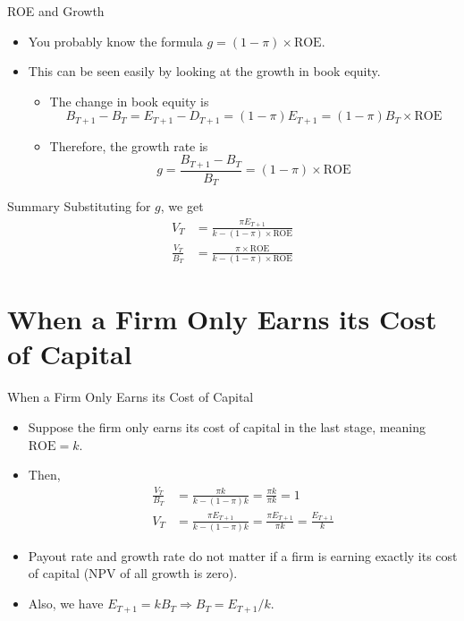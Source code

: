 \documentclass[10pt]{beamer}
\begin{document}
    \begin{frame}{ROE and Growth}
      \begin{itemize}
    \item You probably know the formula $g = (1-\pi) \times \text{ROE}$.
    \item This can be seen easily by looking at the growth in book equity.
      \begin{itemize}
    \item The change in book equity is 
    $$B_{T+1} - B_T = E_{T+1} - D_{T+1} = (1-\pi)E_{T+1} = (1-\pi)B_T \times \text{ROE}$$
    \item Therefore, the growth rate is 
    $$g = \frac{B_{T+1}-B_T}{B_T} = (1-\pi) \times \text{ROE}$$
      \end{itemize}
    \end{itemize}
    \end{frame}

    \begin{frame}{Summary}
     Substituting for $g$, we get
     \begin{align*}
      V_T &= \frac{\pi E_{T+1}}{k - (1-\pi)\times \text{ROE}}\\
      \frac{V_T}{B_T} &= \frac{\pi \times \text{ROE}}{k - (1-\pi) \times \text{ROE}}
     \end{align*}
    \end{frame}

    \section{When a Firm Only Earns its Cost of Capital}

    \begin{frame}{When a Firm Only Earns its Cost of Capital}
    \begin{itemize}
    \item Suppose the firm only earns its cost of capital in the last stage, meaning $\text{ROE} = k$.
    \item Then, 
   \begin{align*}
   \frac{V_T}{B_T} &= \frac{\pi  k}{k - (1-\pi)  k} = \frac{\pi  k}{\pi  k} = 1\\
   V_T &= \frac{\pi E_{T+1}}{k - (1-\pi)  k} = \frac{\pi  E_{T+1}}{\pi  k}= \frac{E_{T+1}}{k}
  \end{align*}
  \item Payout rate and growth rate do not matter if a firm is earning exactly its cost of capital (NPV of all growth is zero).
   \item Also, we have $E_{T+1} = kB_T \Rightarrow B_T = E_{T+1}/k$.
\end{itemize}
\end{frame}
\end{document}
